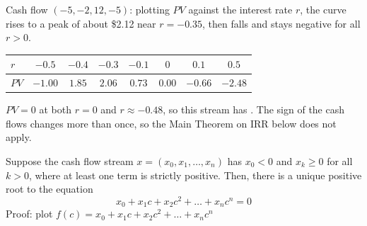 \begin{example}
    Cash flow $(-5, -2, 12, -5)$: plotting $PV$ against the interest rate $r$, the curve rises to a peak of about \$2.12 near $r = -0.35$, then falls and stays negative for all $r > 0$.
    \begin{center}
    \begin{tabular}{lccccccc}
        \toprule
        $r$ & $-0.5$ & $-0.4$ & $-0.3$ & $-0.1$ & $0$ & $0.1$ & $0.5$\\
        \midrule
        $PV$ & $-1.00$ & $1.85$ & $2.06$ & $0.73$ & $0.00$ & $-0.66$ & $-2.48$\\
        \bottomrule
    \end{tabular}
    \end{center}
    \begin{center}
    \end{center}
    $PV = 0$ at both $r = 0$ and $r \approx -0.48$, so this stream has . The sign of the cash flows changes more than once, so the Main Theorem on IRR below does not apply.
\end{example}


Suppose the cash flow stream $x = (x_0, x_1, \dots, x_n)$ has $x_0 < 0$ and $x_k \geq 0$ for all $k > 0$, where at least one term is strictly positive. Then, there is a unique positive root to the equation
\[x_0+x_1c + x_2 c^2 + \dots + x_n c^n = 0\]
Proof: plot $f(c) = x_0 + x_1c + x_2c^2 + \dots + x_n c^n$

